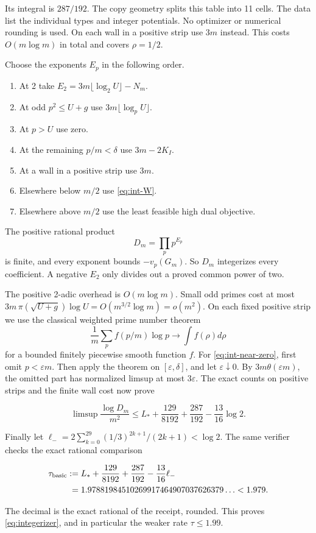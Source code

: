 Its integral is \(287/192\). The copy geometry splits this table into 11
cells. The data list the individual types and integer potentials. No
optimizer or numerical rounding is used. On each wall in a positive strip
use \(3m\) instead. This costs \(O(m\log m)\) in total and covers
\(\rho=1/2\).

Choose the exponents \(E_p\) in the following order.
\begin{enumerate}
\item At 2 take \(E_2=3m\lfloor\log_2U\rfloor-N_m\).
\item At odd \(p^2\le U+g\) use \(3m\lfloor\log_p U\rfloor\).
\item At \(p>U\) use zero.
\item At the remaining \(p/m<\delta\) use \(3m-2K_I\).
\item At a wall in a positive strip use \(3m\).
\item Elsewhere below \(m/2\) use \eqref{eq:int-W}.
\item Elsewhere above \(m/2\) use the least feasible high dual objective.
\end{enumerate}
The positive rational product
\begin{equation}\label{eq:int-Dm}
 D_m=\prod_p p^{E_p}
\end{equation}
is finite, and every exponent bounds \(-v_p(G_m)\). So \(D_m\) integerizes
every coefficient. A negative \(E_2\) only divides out a proved common power
of two.

The positive 2-adic overhead is \(O(m\log m)\). Small odd primes cost at
most \(3m\,\pi(\sqrt{U+g})\log U=O(m^{3/2}\log m)=o(m^2)\). On each fixed
positive strip we use the classical weighted prime number theorem
\[
 \frac1m\sum_p f(p/m)\log p\longrightarrow\int f(\rho)d\rho
\]
for a bounded finitely piecewise smooth function \(f\). For
\eqref{eq:int-near-zero}, first omit \(p<\varepsilon m\). Then apply the
theorem on \([\varepsilon,\delta]\), and let \(\varepsilon\downarrow0\). By
\(3m\theta(\varepsilon m)\), the omitted part has normalized limsup at most
\(3\varepsilon\). The exact counts on positive strips and the finite wall
cost now prove

\[
 \limsup\frac{\log D_m}{m^2}
 \le L_*+\frac{129}{8192}+\frac{287}{192}-\frac{13}{16}\log2.
\]

Finally let \(\ell_-=2\sum_{k=0}^{29}(1/3)^{2k+1}/(2k+1)<\log2\). The same
verifier checks the exact rational comparison

\[
 \begin{aligned}
 \tau_{\rm basic}:={}&L_*+\frac{129}{8192}+\frac{287}{192}
                            -\frac{13}{16}\ell_-\\
 ={}&1.97881984510269917464907037626379\ldots<1.979.
 \end{aligned}
\]

The decimal is the exact rational of the receipt, rounded. This proves
\eqref{eq:integerizer}, and in particular the weaker rate \(\tau\le1.99\).
